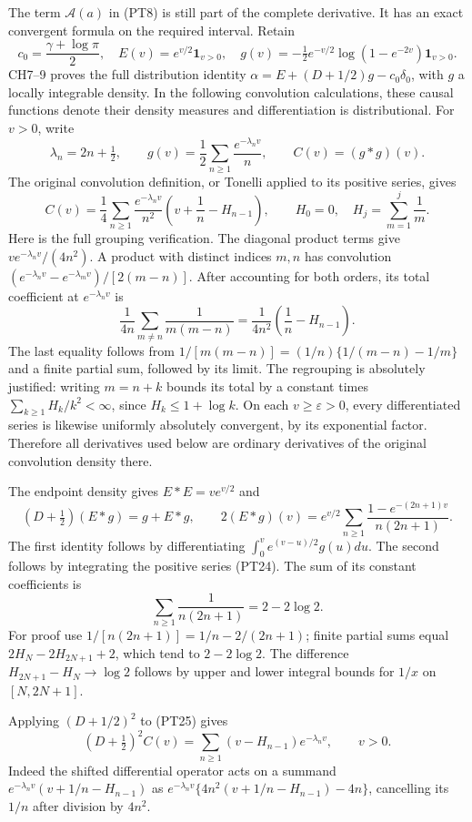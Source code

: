 \documentclass[
  10pt,
  a4paper,
]{article}
\begin{document}
The term \(\mathcal A(a)\) in (PT8) is still part of the complete
derivative. It has an exact convergent formula on the required interval.
Retain \[
c_0=\frac{\gamma+\log\pi}{2},\quad E(v)=e^{v/2}\mathbf1_{v>0},\quad
g(v)=-\tfrac12e^{-v/2}\log(1-e^{-2v})\mathbf1_{v>0}.
\tag{PT23}
\] CH7--9 proves the full distribution identity
\(\alpha=E+(D+1/2)g-c_0\delta_0\), with \(g\) a locally integrable
density. In the following convolution calculations, these causal
functions denote their density measures and differentiation is
distributional. For \(v>0\), write \[
\lambda_n=2n+\tfrac12,\qquad
g(v)=\frac12\sum_{n\ge1}\frac{e^{-\lambda_nv}}n,\qquad
C(v)=(g*g)(v).
\tag{PT24}
\] The original convolution definition, or Tonelli applied to its
positive series, gives \[
\boxed{C(v)=\frac14\sum_{n\ge1}\frac{e^{-\lambda_nv}}{n^2}
\left(v+\frac1n-H_{n-1}\right),\qquad H_0=0,
\quad H_j=\sum_{m=1}^j\frac1m.}
\tag{PT25}
\] Here is the full grouping verification. The diagonal product terms
give \(v e^{-\lambda_nv}/(4n^2)\). A product with distinct indices
\(m,n\) has convolution \((e^{-\lambda_nv}-e^{-\lambda_mv})/[2(m-n)]\).
After accounting for both orders, its total coefficient at
\(e^{-\lambda_nv}\) is \[
\frac1{4n}\sum_{m\ne n}\frac1{m(m-n)}
=\frac1{4n^2}\left(\frac1n-H_{n-1}\right).
\tag{PT26}
\] The last equality follows from \(1/[m(m-n)]=(1/n)\{1/(m-n)-1/m\}\)
and a finite partial sum, followed by its limit. The regrouping is
absolutely justified: writing \(m=n+k\) bounds its total by a constant
times \(\sum_{k\ge1}H_k/k^2<\infty\), since \(H_k\le1+\log k\). On each
\(v\ge\varepsilon>0\), every differentiated series is likewise uniformly
absolutely convergent, by its exponential factor. Therefore all
derivatives used below are ordinary derivatives of the original
convolution density there.

The endpoint density gives \(E*E=ve^{v/2}\) and \[
(D+\tfrac12)(E*g)=g+E*g,\qquad
2(E*g)(v)=e^{v/2}\sum_{n\ge1}\frac{1-e^{-(2n+1)v}}{n(2n+1)}.
\tag{PT27}
\] The first identity follows by differentiating
\(\int_0^v e^{(v-u)/2}g(u)du\). The second follows by integrating the
positive series (PT24). The sum of its constant coefficients is \[
\sum_{n\ge1}\frac1{n(2n+1)}=2-2\log2.
\tag{PT28}
\] For proof use \(1/[n(2n+1)]=1/n-2/(2n+1)\); finite partial sums equal
\(2H_N-2H_{2N+1}+2\), which tend to \(2-2\log2\). The difference
\(H_{2N+1}-H_N\to\log2\) follows by upper and lower integral bounds for
\(1/x\) on \([N,2N+1]\).

Applying \((D+1/2)^2\) to (PT25) gives \[
(D+\tfrac12)^2C(v)=\sum_{n\ge1}(v-H_{n-1})e^{-\lambda_nv},\qquad v>0.
\tag{PT29}
\] Indeed the shifted differential operator acts on a summand
\(e^{-\lambda_nv}(v+1/n-H_{n-1})\) as
\(e^{-\lambda_nv}\{4n^2(v+1/n-H_{n-1})-4n\}\), cancelling its \(1/n\)
after division by \(4n^2\).
\end{document}
